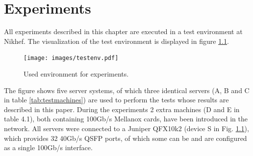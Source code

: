 \chapter{Experiments}\label{ch:experiments}
All experiments described in this chapter are executed in a test environment at Nikhef. The visualization of the test environment is displayed in figure \ref{fig:testenv}. \\ 

\begin{figure}[H]
  \texttt{[image: images/testenv.pdf]}
  \caption{Used environment for experiments.}
  \label{fig:testenv}
\end{figure}

The figure shows five server systems, of which three identical servers (A, B and C in table \ref{tab:testmachines}) are used to perform the tests whose results are described in this paper.
During the experiments 2 extra machines (D and E in table 4.1), both containing 100Gb/s Mellanox cards, have been introduced in the network. All servers were connected to a Juniper QFX10k2 (device S in Fig. \ref{fig:testenv}), which provides 32 40Gb/s QSFP ports, of which some can be and are configured as a single 100Gb/s interface.

